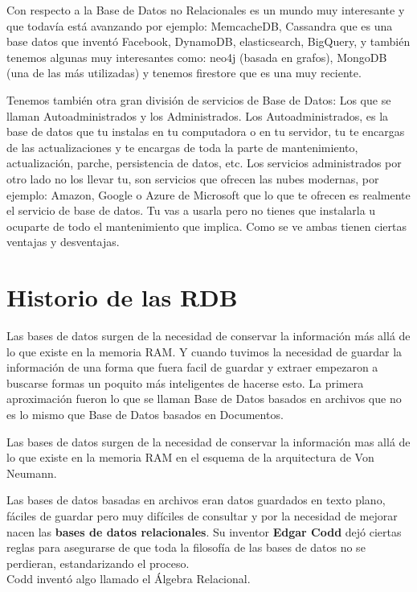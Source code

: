 \documentclass{article}
\begin{document}
Con respecto a la Base de Datos no Relacionales es un mundo muy interesante y
que todavía está avanzando por ejemplo: MemcacheDB, Cassandra que es una base
datos que inventó Facebook, DynamoDB, elasticsearch, BigQuery, y también
tenemos algunas muy interesantes como: neo4j (basada en grafos), MongoDB (una
de las más utilizadas) y tenemos firestore que es una muy reciente.

Tenemos también otra gran división de servicios de Base de Datos: Los que se
llaman Autoadministrados y los Administrados. Los Autoadministrados, es la base
de datos que tu instalas en tu computadora o en tu servidor, tu te encargas de
las actualizaciones y te encargas de toda la parte de mantenimiento,
actualización, parche, persistencia de datos, etc. Los servicios administrados
por otro lado no los llevar tu, son servicios que ofrecen las nubes modernas,
por ejemplo: Amazon, Google o Azure de Microsoft que lo que te ofrecen es
realmente el servicio de base de datos. Tu vas a usarla pero no tienes que
instalarla u ocuparte de todo el mantenimiento que implica. Como se ve ambas
tienen ciertas ventajas y desventajas.

\section{Historio de las RDB}%
Las bases de datos surgen de la necesidad de conservar la información más allá
de lo que existe en la memoria RAM. Y cuando tuvimos la necesidad de guardar la
información de una forma que fuera facil de guardar y extraer empezaron a
buscarse formas un poquito más inteligentes de hacerse esto. La primera
aproximación fueron lo que se llaman Base de Datos basados en archivos que no
es lo mismo que Base de Datos basados en Documentos.

Las bases de datos surgen de la necesidad de conservar la información mas allá
de lo que existe en la memoria RAM en el esquema de la arquitectura de Von
Neumann.

Las bases de datos basadas en archivos eran datos guardados en texto plano,
fáciles de guardar pero muy difíciles de consultar y por la necesidad de
mejorar nacen las \textbf{bases de datos relacionales}. Su inventor
\textbf{Edgar Codd} dejó ciertas reglas para asegurarse de que toda la
filosofía de las bases de datos no se perdieran, estandarizando el proceso.\\

Codd inventó algo llamado el Álgebra Relacional.
\end{document}
